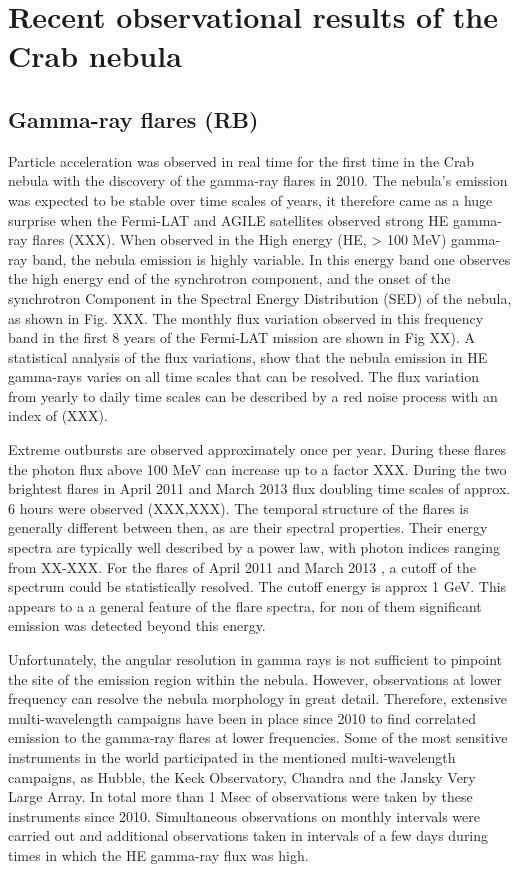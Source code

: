 \section{Recent observational results of the Crab nebula}
\subsection{Gamma-ray flares (RB)}

Particle acceleration was observed in real time for the first time in the Crab nebula with the discovery of the gamma-ray flares in 2010.  The nebula's emission was expected to  be stable over time scales of years, it therefore came as a huge surprise when the Fermi-LAT and AGILE satellites observed strong HE gamma-ray flares (XXX). When observed in the High energy (HE, > 100 MeV) gamma-ray band, the nebula emission is highly variable. In this energy band one observes the high energy end of the synchrotron component, and the onset of the synchrotron Component in the Spectral Energy Distribution (SED) of the nebula, as shown in Fig. XXX. The monthly flux variation observed in this frequency band in the first 8 years of the Fermi-LAT mission are shown in Fig XX). A statistical analysis of the flux variations, show that the nebula emission in HE gamma-rays varies on all time scales that can be resolved. The flux variation from yearly to daily time scales can be described by a red noise process with an index of (XXX).

Extreme outbursts are observed approximately once per year. During these flares the photon flux above 100 MeV can increase up to a factor XXX. During the two brightest flares in April 2011 and March 2013 flux doubling time scales of approx. 6 hours were observed (XXX,XXX). The temporal structure of the flares is generally different between then, as are their spectral properties. Their energy spectra are typically well described by a power law, with photon indices ranging from XX-XXX. For the flares of April 2011 and March 2013 , a cutoff of the spectrum could be statistically resolved. The cutoff energy is approx 1 GeV. This appears to a a general feature of the flare spectra, for non of them significant emission was detected beyond this energy.

Unfortunately, the angular resolution in gamma rays is not sufficient to pinpoint the site of the emission region within the nebula. However, observations at lower frequency can resolve the nebula morphology in great detail. Therefore, extensive multi-wavelength campaigns have been in place since 2010 to find correlated emission to the gamma-ray flares at lower frequencies. Some of the most sensitive instruments in the world participated in the mentioned multi-wavelength campaigns, as Hubble, the Keck Observatory, Chandra and the Jansky Very Large Array. In total more than 1 Msec of observations were taken by these  instruments since 2010. Simultaneous observations on monthly intervals were carried out and additional observations taken in intervals of a few days during times in which the HE gamma-ray flux was high. 


